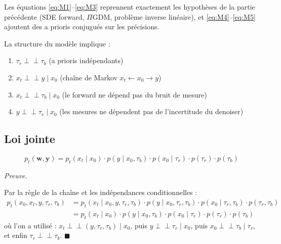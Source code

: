 \documentclass[12pt]{article}
\newcommand{\indep}{\perp\!\!\!\perp}
\renewcommand{\qedsymbol}{$\blacksquare$}
\renewenvironment{proof}[1][\proofname]{%
  \par\medskip\noindent
  \textit{\color{proofgray}#1.}\enspace\ignorespaces
}{\hfill\qedsymbol\par\medskip}
\renewcommand{\proofname}{Preuve}
\begin{document}
Les équations \ref{eq:M1}--\ref{eq:M3} reprennent exactement les hypothèses de la partie précédente (SDE forward, $\Pi$GDM, problème inverse linéaire), et \ref{eq:M4}--\ref{eq:M5} ajoutent des a prioris conjugués sur les précisions.

\begin{remarkbox}
La structure du modèle implique 
:
\begin{enumerate}[label=(\roman*)]
    \item $\tau_r \indep \tau_b$ \quad (a prioris indépendants)
    \item $x_t \indep y \mid x_0$ \quad (chaîne de Markov $x_t \leftarrow x_0 \to y$)
    \item $x_t \indep \tau_b \mid x_0$ \quad (le forward ne dépend pas du bruit de mesure)
    \item $y \indep \tau_r \mid x_0$ \quad (les mesures ne dépendent pas de l'incertitude du denoiser)
\end{enumerate}
\end{remarkbox}


\subsection{Loi jointe}

\begin{propositionbox}
\label{prop:joint}
\begin{equation}
    \boxed{p_t(\boldsymbol{w}, \boldsymbol{y}) = p_t(x_t \mid x_0) \cdot p(y \mid x_0, \tau_b) \cdot p(x_0 \mid \tau_r) \cdot p(\tau_r) \cdot p(\tau_b)}
    \label{eq:joint}
\end{equation}
\end{propositionbox}

 \begin{proof}





Par la règle de la chaîne et les indépendances conditionnelles 
:
\begin{align}
    p_t(x_0, x_t, y, \tau_r, \tau_b) &= p_t(x_t \mid x_0, y, \tau_r, \tau_b) \cdot p(y \mid x_0, \tau_r, \tau_b) \cdot p(x_0 \mid \tau_r, \tau_b) \cdot p(\tau_r, \tau_b) \nonumber\\
    &= p_t(x_t \mid x_0) \cdot p(y \mid x_0, \tau_b) \cdot p(x_0 \mid \tau_r) \cdot p(\tau_r) \cdot p(\tau_b)
\end{align}
où l'on a utilisé 
: $x_t \indep (y, \tau_r, \tau_b) \mid x_0$, puis $y \indep \tau_r \mid x_0$, puis $x_0 \indep \tau_b \mid \tau_r$, et enfin $\tau_r \indep \tau_b$.
\end{proof}
\end{document}
